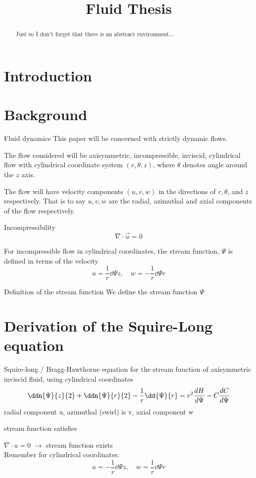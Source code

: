 \documentclass{X:/Documents/Coding/Latex/myreport}
\title{Fluid Thesis}
\begin{document}
\maketitle
\begin{abstract}
    Just so I don't forget that there is an abstract environment...
\end{abstract}
\clearpage
\tableofcontents
\section{Introduction}

\section{Background}
Fluid dynamics 
This paper will be concerned with strictly dynamic flows.


The flow considered will be axisymmetric, incompressible, inviscid, cylindrical flow with cylindrical coordinate system $(r,\theta,z)$, where $\theta$ denotes angle around the $z$ axis.


The flow will have velocity components $(u,v,w)$ in the directions of $r,\theta$, and $z$ respectively. That is to say $u, v, w$ are the radial, azimuthal and axial components of the flow respectively.




Incompressibility
\[\nabla \cdot \vec u = 0 \]

For incompressible flow in cylindrical coordinates, the stream function, $\Psi$ is defined in terms of the velocity
\[u = \frac{1}{r} \dd\Psi z, \quad w = - \frac{1}{r} \dd \Psi r\]



Definition of the stream function
We define the stream function $\Psi$ 


\section{Derivation of the Squire-Long equation}
Squire-long / Bragg-Hawthorne equation for the stream function of axisymmetric inviscid fluid, using cylindrical coordinates
\[\ddn{\Psi}{z}{2} + \ddn{\Psi}{r}{2} - \frac1r \dd{\Psi}{r} = r^2 \frac{dH}{d\Psi} - C \frac{dC}{d\Psi}\]
radial component u,  azimuthal (swirl) is v, axial component w

stream function satisfies

$\nabla \cdot u = 0$ $\longrightarrow$ stream function exists\\
Remember for cylindrical coordinates:
\[u = -\frac1r \dd\Psi{z}, \quad w = \frac1r \dd\Psi{r} \]
\end{document}

